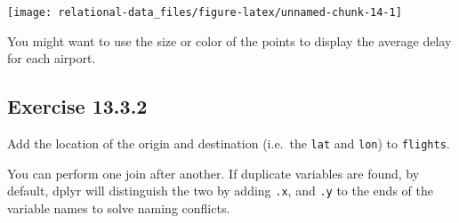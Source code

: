 \documentclass[]{book}
\newenvironment{Shaded}{\begin{snugshade}}{\end{snugshade}}
\newcommand{\CommentTok}[1]{\textcolor[rgb]{0.56,0.35,0.01}{\textit{#1}}}
\newcommand{\DataTypeTok}[1]{\textcolor[rgb]{0.13,0.29,0.53}{#1}}
\newcommand{\KeywordTok}[1]{\textcolor[rgb]{0.13,0.29,0.53}{\textbf{#1}}}
\newcommand{\NormalTok}[1]{#1}
\newcommand{\OperatorTok}[1]{\textcolor[rgb]{0.81,0.36,0.00}{\textbf{#1}}}
\newcommand{\OtherTok}[1]{\textcolor[rgb]{0.56,0.35,0.01}{#1}}
\newcommand{\StringTok}[1]{\textcolor[rgb]{0.31,0.60,0.02}{#1}}
\theoremstyle{plain}
\theoremstyle{remark}
\begin{document}
\begin{Shaded}
\end{Shaded}

\begin{center}\texttt{[image: relational-data\_files/figure-latex/unnamed-chunk-14-1]} \end{center}

You might want to use the size or color of the points to display the
average delay for each airport.

\hypertarget{exercise-13.3.2}{%
\subsection*{\texorpdfstring{Exercise
{13.3.2}}{Exercise 13.3.2}}\label{exercise-13.3.2}}

Add the location of the origin and destination (i.e.~the \texttt{lat}
and \texttt{lon}) to \texttt{flights}.

You can perform one join after another. If duplicate variables are
found, by default, dplyr will distinguish the two by adding \texttt{.x},
and \texttt{.y} to the ends of the variable names to solve naming
conflicts.
\end{document}

